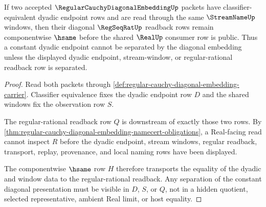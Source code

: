 \begin{theorem}
\label{thm:regular-cauchy-diagonal-embedding-constant-sequence-stability}
If two accepted $\RegularCauchyDiagonalEmbeddingUp$ packets have classifier-equivalent dyadic endpoint rows and are read through the same $\StreamNameUp$ windows, then their diagonal $\RegSeqRatUp$ readback rows remain componentwise $\hsame$ before the shared $\RealUp$ consumer row is public. Thus a constant dyadic endpoint cannot be separated by the diagonal embedding unless the displayed dyadic endpoint, stream-window, or regular-rational readback row is separated.
\end{theorem}
\begin{proof}
Read both packets through \autoref{def:regular-cauchy-diagonal-embedding-carrier}. Classifier equivalence fixes the dyadic endpoint row $D$ and the shared windows fix the observation row $S$.

The regular-rational readback row $Q$ is downstream of exactly those two rows. By \autoref{thm:regular-cauchy-diagonal-embedding-namecert-obligations}, a Real-facing read cannot inspect $R$ before the dyadic endpoint, stream windows, regular readback, transport, replay, provenance, and local naming rows have been displayed.

The componentwise $\hsame$ row $H$ therefore transports the equality of the dyadic and window data to the regular-rational readback. Any separation of the constant diagonal presentation must be visible in $D$, $S$, or $Q$, not in a hidden quotient, selected representative, ambient Real limit, or host equality.
\end{proof}




